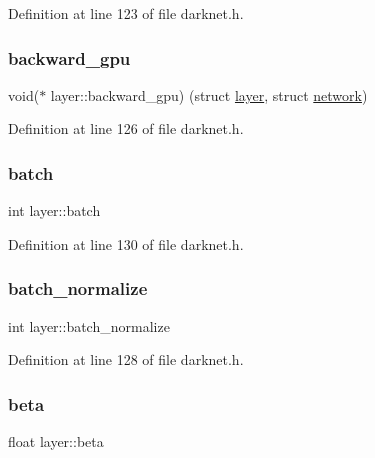 Definition at line 123 of file darknet.\+h.

\mbox{\label{structlayer_aedf9ba6db46b7291b41f424ff6346784}} 
\subsubsection{\texorpdfstring{backward\_gpu}{backward\_gpu}}
{\footnotesize\ttfamily void($\ast$ layer\+::backward\+\_\+gpu) (struct \mbox{\hyperlink{structlayer}{layer}}, struct \mbox{\hyperlink{structnetwork}{network}})}



Definition at line 126 of file darknet.\+h.

\mbox{\label{structlayer_aff6bd99e74d13cccca4c492dd3e8de9c}} 
\subsubsection{\texorpdfstring{batch}{batch}}
{\footnotesize\ttfamily int layer\+::batch}



Definition at line 130 of file darknet.\+h.

\mbox{\label{structlayer_a9af00a1fb4729a6ecdc62df42f4d3ae3}} 
\subsubsection{\texorpdfstring{batch\_normalize}{batch\_normalize}}
{\footnotesize\ttfamily int layer\+::batch\+\_\+normalize}



Definition at line 128 of file darknet.\+h.

\mbox{\label{structlayer_a375acd63c42b47b9c3007a1c064caef7}} 
\subsubsection{\texorpdfstring{beta}{beta}}
{\footnotesize\ttfamily float layer\+::beta}



